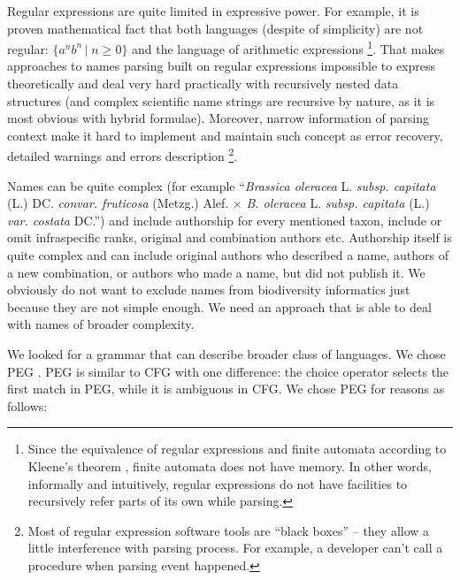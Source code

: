 \documentclass{bmcart}
\begin{document}
Regular expressions are quite limited in expressive power. For example, it is
proven mathematical fact that both languages (despite of simplicity) are not
regular: $\{a^nb^n\,\vert\; n\ge 0\} $ and the language of arithmetic
expressions \footnote{Since the equivalence of regular expressions and finite
automata according to Kleene's theorem \cite{yu1997handbook}, finite automata
does not have memory. In other words, informally and intuitively, regular
expressions do not have facilities to recursively refer parts of its own while
parsing.}. That makes approaches to names parsing built on regular expressions
\cite{gbif} impossible to express theoretically and deal very hard practically
with recursively nested data structures (and complex scientific name strings
are recursive by nature, as it is most obvious with hybrid formulae).
Moreover, narrow information of parsing context make it hard to implement and
maintain such concept as error recovery, detailed warnings and errors
description \footnote{Most of regular expression software tools are ``black 
boxes'' -- they allow a little interference with parsing process. For example, a
developer can't call a procedure when parsing event happened.}.

Names can be quite complex (for example ``\textit{Brassica oleracea} L.
\textit{subsp.  capitata} (L.) DC. \textit{convar. fruticosa} (Metzg.) Alef.
$\times$ \textit{B. oleracea} L. \textit{subsp. capitata} (L.) \textit{var.
costata} DC.'')  and include authorship for every mentioned taxon, include or
omit infraspecific ranks, original and combination authors etc. Authorship
itself is quite complex and can include original authors who described a name,
authors of a new combination, or authors who made a name, but did not publish
it. We obviously do not want to exclude names from biodiversity informatics
just because they are not simple enough. We need an approach that is able to
deal with names of broader complexity.

We looked for a grammar that can describe broader class of languages. We chose
PEG \cite{Ford2004}. PEG is similar to CFG with one difference: the choice
operator selects the first match in PEG, while it is ambiguous in CFG. We
chose PEG for reasons as follows:
\end{document}
